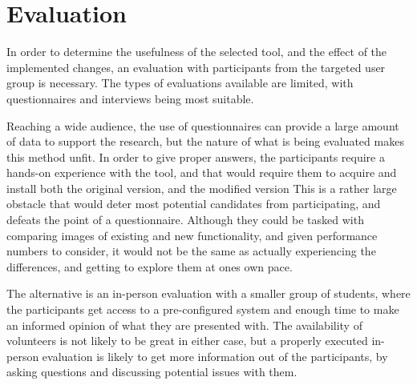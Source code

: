 \section{Evaluation}\label{methEval}

In order to determine the usefulness of the selected tool, and the  effect of the implemented changes, an evaluation with participants from the targeted user group is necessary.
The types of evaluations available are limited, with questionnaires and interviews being most suitable.


Reaching a wide audience, the use of questionnaires can provide a large amount of data to support the research, but the nature of what is being evaluated makes this method unfit.
In order to give proper answers, the participants require a hands-on experience with the tool, and that would require them to acquire and install both the original version, and the modified version
This is a rather large obstacle that would deter most potential candidates from participating, and defeats the point of a questionnaire.
Although they could be tasked with comparing images of existing and new functionality, and given performance numbers to consider, it would not be the same as actually experiencing the differences, and getting to explore them at ones own pace.


The alternative is an in-person evaluation with a smaller group of students, where the participants get access to a pre-configured system and enough time to make an informed opinion of what they are presented with.
The availability of volunteers is not likely to be great in either case, but a properly executed in-person evaluation is likely to get more information out of the participants, by asking questions and discussing potential issues with them.


